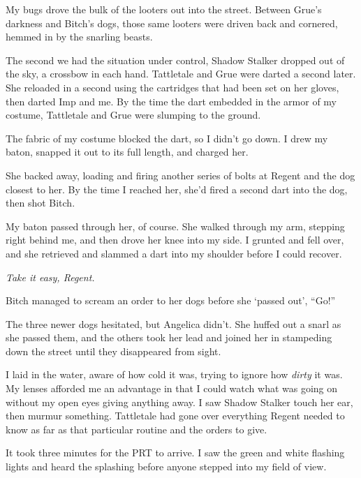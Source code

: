 My bugs drove the bulk of the looters out into the street.  Between Grue's darkness and Bitch's dogs, those same looters were driven back and cornered, hemmed in by the snarling beasts.



The second we had the situation under control, Shadow Stalker dropped out of the sky, a crossbow in each hand.  Tattletale and Grue were darted a second later.  She reloaded in a second using the cartridges that had been set on her gloves, then darted Imp and me.  By the time the dart embedded in the armor of my costume, Tattletale and Grue were slumping to the ground.



The fabric of my costume blocked the dart, so I didn't go down.  I drew my baton, snapped it out to its full length, and charged her.



She backed away, loading and firing another series of bolts at Regent and the dog closest to her.  By the time I reached her, she'd fired a second dart into the dog, then shot Bitch.



My baton passed through her, of course.  She walked through my arm, stepping right behind me, and then drove her knee into my side.  I grunted and fell over, and she retrieved and slammed a dart into my shoulder before I could recover.



\emph{Take it easy, Regent.}



Bitch managed to scream an order to her dogs before she `passed out', ``Go!''



The three newer dogs hesitated, but Angelica didn't.  She huffed out a snarl as she passed them, and the others took her lead and joined her in stampeding down the street until they disappeared from sight.



I laid in the water, aware of how cold it was, trying to ignore how \emph{dirty} it was.  My lenses afforded me an advantage in that I could watch what was going on without my open eyes giving anything away.  I saw Shadow Stalker touch her ear, then murmur something.  Tattletale had gone over everything Regent needed to know as far as that particular routine and the orders to give.



It took three minutes for the PRT to arrive.  I saw the green and white flashing lights and heard the splashing before anyone stepped into my field of view.



